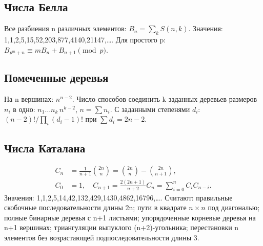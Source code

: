 \subsection{Числа Белла}
Все разбиения n различных элементов: $B_n=\sum_kS(n,k)$.
Значения: 1,1,2,5,15,52,203,877,4140,21147,\dots.
Для простого p: $B_{p^m+n}\equiv mB_n+B_{n+1}\pmod p$.
\subsection{Помеченные деревья}
На n вершинах: $n^{n-2}$.
Число способов соединить k заданных деревьев размеров $n_i$
в одно: $n_1\dots n_k\,n^{k-2}$, $n=\sum n_i$.
С заданными степенями $d_i$:
$(n-2)!/\prod_i(d_i-1)!$ при $\sum d_i=2n-2$.
\subsection{Числа Каталана}
\begin{align*}
C_n&=\frac1{n+1}\binom{2n}{n}=\binom{2n}{n}-\binom{2n}{n+1},\\
C_0&=1,\quad C_{n+1}=\frac{2(2n+1)}{n+2}C_n
=\sum_{i=0}^n C_iC_{n-i}.
\end{align*}
Значения: 1,1,2,5,14,42,132,429,1430,4862,16796,\dots.
Считают: правильные скобочные последовательности длины 2n;
пути в квадрате $n\times n$ под диагональю; полные бинарные деревья
с n+1 листьями; упорядоченные корневые деревья на n+1 вершинах;
триангуляции выпуклого (n+2)-угольника; перестановки n элементов
без возрастающей подпоследовательности длины 3.
